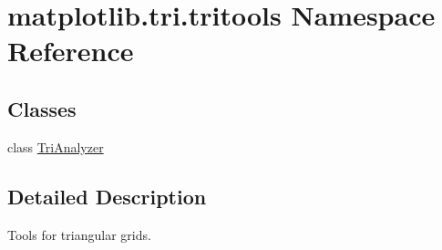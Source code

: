 \hypertarget{namespacematplotlib_1_1tri_1_1tritools}{}\section{matplotlib.\+tri.\+tritools Namespace Reference}
\label{namespacematplotlib_1_1tri_1_1tritools}
\subsection*{Classes}
\begin{DoxyCompactItemize}
\item 
class \hyperlink{classmatplotlib_1_1tri_1_1tritools_1_1TriAnalyzer}{Tri\+Analyzer}
\end{DoxyCompactItemize}


\subsection{Detailed Description}
\begin{DoxyVerb}Tools for triangular grids.
\end{DoxyVerb}
 